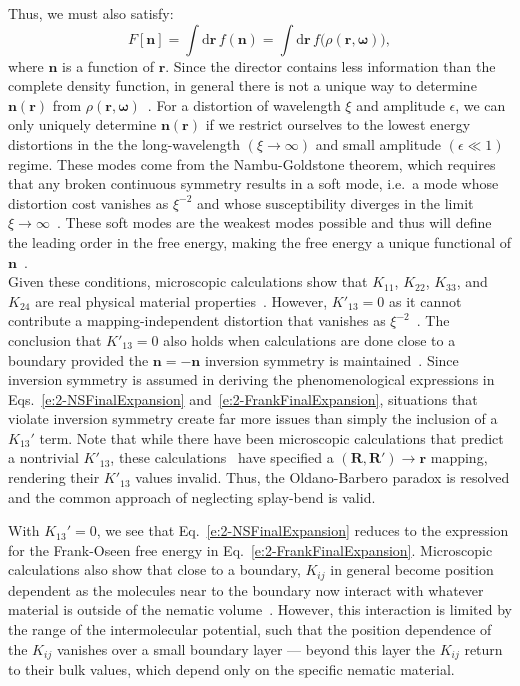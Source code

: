 Thus, we must also satisfy:
\begin{equation}
  F[\mathbf{n}] = \int \textrm{d} \mathbf{r} \, f(\mathbf{n}) = \int \textrm{d} \mathbf{r} \, f \big ( \rho(\mathbf{r},\mathbf{\omega}) \big),\label{e:2-LessInfo}
\end{equation}
where $\mathbf{n}$ is a function of $\mathbf{r}$.
Since the director contains less information than the complete density function, in general there is not a unique way to determine $\mathbf{n}(\mathbf{r})$ from $\rho(\mathbf{r},\mathbf{\omega})$~\cite{RN55}.
For a distortion of wavelength $\xi$ and amplitude $\epsilon$, we can only uniquely determine $\mathbf{n}(\mathbf{r})$ if we restrict ourselves to the lowest energy distortions in the the long-wavelength $(\xi \rightarrow \infty)$ and small amplitude $(\epsilon \ll 1)$ regime. 
These modes come from the Nambu-Goldstone theorem, which requires that any broken continuous symmetry results in a soft mode, i.e.\ a mode whose distortion cost vanishes as $\xi^{-2}$ and whose susceptibility diverges in the limit $\xi \rightarrow \infty$~\cite{RN175,RN226,RN227,RN228}.
These soft modes are the weakest modes possible and thus will define the leading order in the free energy, making the free energy a unique functional of $\mathbf{n}$~\cite{RN55}. \\

Given these conditions, microscopic calculations show that $K_{11}$, $K_{22}$, $K_{33}$, and $K_{24}$ are real physical material properties~\cite{RN55,RN56,RN225,RN224,RN217,RN222}.
However, $K'_{13} = 0$ as it cannot contribute a mapping-independent distortion that vanishes as $\xi^{-2}$~\cite{RN55,RN225}.
The conclusion that $K'_{13} = 0$ also holds when calculations are done close to a boundary provided the $\mathbf{n} = -\mathbf{n}$ inversion symmetry is maintained~\cite{RN56}.
Since inversion symmetry is assumed in deriving the phenomenological expressions in Eqs.~\ref{e:2-NSFinalExpansion} and~\ref{e:2-FrankFinalExpansion}, situations that violate inversion symmetry create far more issues than simply the inclusion of a $K_{13}'$ term.
Note that while there have been microscopic calculations that predict a nontrivial $K'_{13}$, these calculations~\cite{RN224,RN217,RN222} have specified a $(\mathbf{R},\mathbf{R}') \rightarrow \mathbf{r}$ mapping, rendering their $K'_{13}$ values invalid.
Thus, the Oldano-Barbero paradox is resolved and the common approach of neglecting splay-bend is valid.

With $K_{13}'=0$, we see that Eq.~\ref{e:2-NSFinalExpansion} reduces to the expression for the Frank-Oseen free energy in Eq.~\ref{e:2-FrankFinalExpansion}.
Microscopic calculations also show that close to a boundary, $K_{ij}$ in general become position dependent as the molecules near to the boundary now interact with whatever material is outside of the nematic volume~\cite{RN56,RN57,RN55}.
However, this interaction is limited by the range of the intermolecular potential, such that the position dependence of the $K_{ij}$ vanishes over a small boundary layer --- beyond this layer the $K_{ij}$ return to their bulk values, which depend only on the specific nematic material.\\


